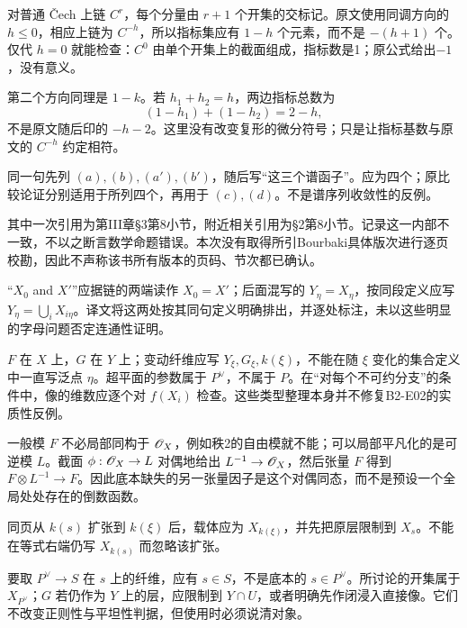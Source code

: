 对普通 Čech 上链 $C^r$，每个分量由 $r+1$ 个开集的交标记。原文使用同调方向的 $h\leq0$，相应上链为 $C^{-h}$，所以指标集应有 $1-h$ 个元素，而不是 $-(h+1)$ 个。仅代 $h=0$ 就能检查：$C^0$ 由单个开集上的截面组成，指标数是1；原公式给出$-1$，没有意义。

第二个方向同理是 $1-k$。若 $h_1+h_2=h$，两边指标总数为
\[
 (1-h_1)+(1-h_2)=2-h,
\]
不是原文随后印的 $-h-2$。这里没有改变复形的微分符号；只是让指标基数与原文的 $C^{-h}$ 约定相符。

同一句先列 $(a),(b),(a'),(b')$，随后写“这三个谱函子”。应为四个；原比较论证分别适用于所列四个，再用于 $(c),(d)$。不是谱序列收敛性的反例。

其中一次引用为第III章§3第8小节，附近相关引用为§2第8小节。记录这一内部不一致，不以之断言数学命题错误。本次没有取得所引Bourbaki具体版次进行逐页校勘，因此不声称该书所有版本的页码、节次都已确认。

“$X_0$ and $X'$”应据链的两端读作 $X_0=X'$；后面混写的 $Y_\eta=X_\eta$，按同段定义应写 $Y_\eta=\bigcup_iX_{i\eta}$。译文将这两处按其同句定义明确排出，并逐处标注，未以这些明显的字母问题否定连通性证明。

$F$ 在 $X$ 上，$G$ 在 $Y$ 上；变动纤维应写 $Y_\xi,G_\xi,k(\xi)$，不能在随 $\xi$ 变化的集合定义中一直写泛点 $\eta$。超平面的参数属于 $P^\vee$，不属于 $P$。在“对每个不可约分支”的条件中，像的维数应逐个对 $f(X_i)$ 检查。这些类型整理本身并不修复B2-E02的实质性反例。

一般模 $F$ 不必局部同构于 $\mathscr O_X$，例如秩2的自由模就不能；可以局部平凡化的是可逆模 $L$。截面 $\phi:\mathscr O_X\to L$ 对偶地给出 $L^{-1}\to\mathscr O_X$，然后张量 $F$ 得到 $F\otimes L^{-1}\to F$。因此底本缺失的另一张量因子是这个对偶同态，而不是预设一个全局处处存在的倒数函数。

同页从 $k(s)$ 扩张到 $k(\xi)$ 后，载体应为 $X_{k(\xi)}$，并先把原层限制到 $X_s$。不能在等式右端仍写 $X_{k(s)}$ 而忽略该扩张。

要取 $P^\vee\to S$ 在 $s$ 上的纤维，应有 $s\in S$，不是底本的 $s\in P^\vee$。所讨论的开集属于 $X_{P^\vee}$；$G$ 若仍作为 $Y$ 上的层，应限制到 $Y\cap U$，或者明确先作闭浸入直接像。它们不改变正则性与平坦性判据，但使用时必须说清对象。

